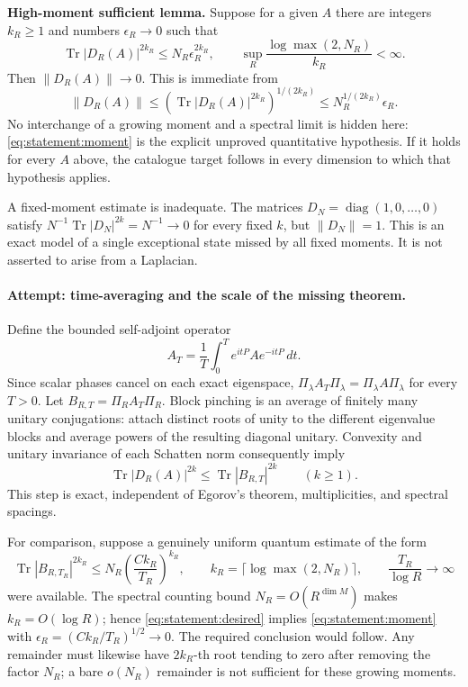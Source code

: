 \documentclass[11pt,a4paper]{article}
\numberwithin{equation}{section}
\begin{document}
\textbf{High-moment sufficient lemma.}
Suppose for a given $A$ there are integers $k_R\geq1$ and numbers
$\epsilon_R\to0$ such that
\begin{equation}\label{eq:statement:moment}
 \operatorname{Tr}|D_R(A)|^{2k_R}\leq N_R\epsilon_R^{2k_R},
 \qquad \sup_R\frac{\log\max(2,N_R)}{k_R}<\infty.
\end{equation}
Then $\|D_R(A)\|\to0$. This is immediate from
\[
 \|D_R(A)\|\leq
 (\operatorname{Tr}|D_R(A)|^{2k_R})^{1/(2k_R)}
 \leq N_R^{1/(2k_R)}\epsilon_R.
\]
No interchange of a growing moment and a spectral limit is hidden here:
\eqref{eq:statement:moment} is the explicit unproved quantitative hypothesis.
If it holds for every $A$ above, the catalogue target follows in every
dimension to which that hypothesis applies.

A fixed-moment estimate is inadequate. The matrices
$D_N=\operatorname{diag}(1,0,\ldots,0)$ satisfy
$N^{-1}\operatorname{Tr}|D_N|^{2k}=N^{-1}\to0$ for every fixed $k$, but
$\|D_N\|=1$. This is an exact model of a single exceptional state missed
by all fixed moments. It is not asserted to arise from a Laplacian.

\paragraph{Attempt: time-averaging and the scale of the missing theorem.}
Define the bounded self-adjoint operator
\[
 A_T=\frac1T\int_0^T e^{itP}Ae^{-itP}\,dt.
\]
Since scalar phases cancel on each exact eigenspace,
$\Pi_\lambda A_T\Pi_\lambda=\Pi_\lambda A\Pi_\lambda$ for every $T>0$.
Let $B_{R,T}=\Pi_R A_T\Pi_R$. Block pinching is an average of finitely
many unitary conjugations: attach distinct roots of unity to the different
eigenvalue blocks and average powers of the resulting diagonal unitary.
Convexity and unitary invariance of each Schatten norm consequently imply
\begin{equation}\label{eq:statement:pinching}
 \operatorname{Tr}|D_R(A)|^{2k}
 \leq\operatorname{Tr}|B_{R,T}|^{2k}\qquad(k\geq1).
\end{equation}
This step is exact, independent of Egorov's theorem, multiplicities, and
spectral spacings.

For comparison, suppose a genuinely uniform quantum estimate of the form
\begin{equation}\label{eq:statement:desired}
 \operatorname{Tr}|B_{R,T_R}|^{2k_R}
 \leq N_R\left(\frac{Ck_R}{T_R}\right)^{k_R},\qquad
 k_R=\lceil\log\max(2,N_R)\rceil,
 \qquad \frac{T_R}{\log R}\longrightarrow\infty
\end{equation}
were available. The spectral counting bound $N_R=O(R^{\dim M})$ makes
$k_R=O(\log R)$; hence \eqref{eq:statement:desired} implies
\eqref{eq:statement:moment} with $\epsilon_R=(Ck_R/T_R)^{1/2}\to0$.
The required conclusion would follow. Any remainder must likewise have
$2k_R$-th root tending to zero after removing the factor $N_R$; a bare
$o(N_R)$ remainder is not sufficient for these growing moments.
\end{document}
